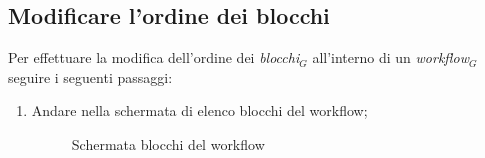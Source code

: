 \subsection{Modificare l'ordine dei blocchi}
Per effettuare la modifica dell'ordine dei \textit{blocchi$_{G}$} all'interno di un \textit{workflow$_{G}$} seguire i seguenti passaggi:
\begin{enumerate}
	\item Andare nella schermata di elenco blocchi del workflow;
	\begin{figure}[!ht]
		\centering
		\caption{Schermata blocchi del workflow}
	\end{figure}
	\newpage

\end{enumerate}
